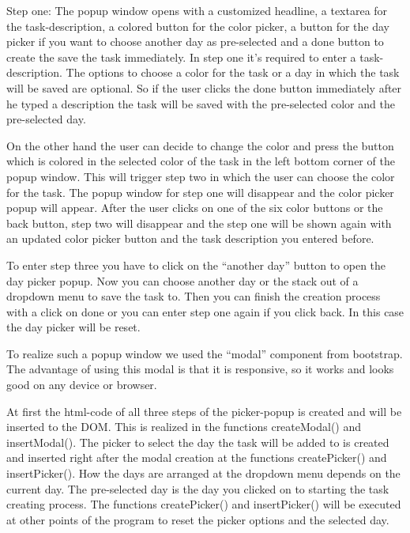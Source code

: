 Step one:
The popup window opens with a customized headline, a textarea for the task-description, a colored button for the color picker, a button for the day picker if you want to choose another day as pre-selected and a done button to create the save the task immediately.
In step one it’s required to enter a task-description. The options to choose a color for the task or a day in which the task will be saved are optional. So if the user clicks the done button immediately after he typed a description the task will be saved with the pre-selected color and the pre-selected day. 

On the other hand the user can decide to change the color and press the button which is colored in the selected color of the task in the left bottom corner of the popup window. This will trigger step two in which the user can choose the color for the task. The popup window for step one will disappear and the color picker popup will appear. After the user clicks on one of the six color buttons or the back button, step two will disappear and the step one will be shown again with an updated color picker button and the task description you entered before.

To enter step three you have to click on the “another day” button to open the day picker popup. Now you can choose another day or the stack out of a dropdown menu to save the task to. Then you can finish the creation process with a click on done or you can enter step one again if you click back. In this case the day picker will be reset.

To realize such a popup window we used the “modal” component from bootstrap. The advantage of using this modal is that it is responsive, so it works and looks good on any device or browser.  

At first the html-code of all three steps of the picker-popup is created and will be inserted to the DOM. This is realized in the functions createModal() and insertModal(). The picker to select the day the task will be added to is created and inserted right after the modal creation at the functions createPicker() and insertPicker(). How the days are arranged at the dropdown menu depends on the current day. The pre-selected day is the day you clicked on to starting the task creating process. The functions createPicker() and insertPicker() will be executed at other points of the program to reset the picker options and the selected day. 


